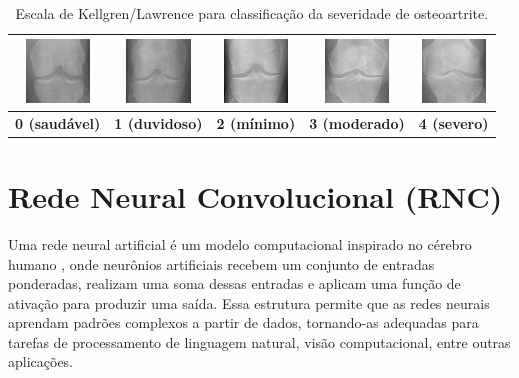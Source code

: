\begin{table}[htbp]
    \centering
    \begin{tabular}{|c|c|c|c|c|}
        \hline
        \includegraphics[width=1.7cm]{figs/KL0-sample.png} & \includegraphics[width=1.7cm]{figs/KL1-sample.png} & \includegraphics[width=1.7cm]{figs/KL2-sample.png} & \includegraphics[width=1.7cm]{figs/KL3-sample.png} & \includegraphics[width=1.7cm]{figs/KL4-sample.png} \\
        \hline
        \textbf{0 (saudável)} & \textbf{1 (duvidoso)} & \textbf{2 (mínimo)} & \textbf{3 (moderado)} & \textbf{4 (severo)} \\
        \hline
    \end{tabular}
    \caption{Escala de Kellgren/Lawrence para classificação da severidade de osteoartrite.}
    \label{tabela-kl}
\end{table}

\section{Rede Neural Convolucional (RNC)}\label{sec:rnc}

Uma rede neural artificial é um modelo computacional inspirado no cérebro humano \citep{McCulloch1943}, onde neurônios artificiais recebem um conjunto de entradas ponderadas, realizam uma soma dessas entradas e aplicam uma função de ativação para produzir uma saída. Essa estrutura permite que as redes neurais aprendam padrões complexos a partir de dados, tornando-as adequadas para tarefas de processamento de linguagem natural, visão computacional, entre outras aplicações.


